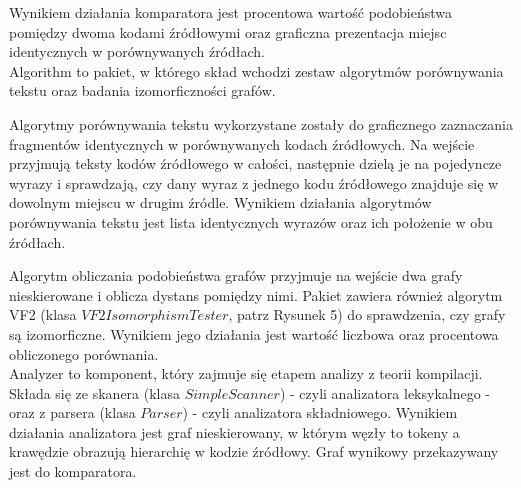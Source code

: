 \documentclass[a4paper,12pt,twoside]{article}
\begin{document}
Wynikiem działania komparatora jest procentowa wartość podobieństwa pomiędzy dwoma kodami źródłowymi oraz graficzna prezentacja miejsc identycznych w porównywanych źródłach.
\\

Algorithm to pakiet, w którego skład wchodzi zestaw algorytmów porównywania tekstu oraz badania izomorficzności grafów. 

Algorytmy porównywania tekstu wykorzystane zostały do graficznego zaznaczania fragmentów identycznych w porównywanych kodach źródłowych. Na wejście przyjmują teksty kodów źródłowego w całości, następnie dzielą je na pojedyncze wyrazy i sprawdzają, czy dany wyraz z jednego kodu źródłowego znajduje się w dowolnym miejscu w drugim źródle. Wynikiem działania algorytmów porównywania tekstu jest lista identycznych wyrazów oraz ich położenie w obu źródłach.

Algorytm obliczania podobieństwa grafów przyjmuje na wejście dwa grafy nieskierowane i oblicza dystans pomiędzy nimi. Pakiet zawiera również algorytm VF2 (klasa $VF2IsomorphismTester$, patrz Rysunek 5) do sprawdzenia, czy grafy są izomorficzne. Wynikiem jego działania jest wartość liczbowa oraz procentowa obliczonego porównania.
\\ 

Analyzer to komponent, który zajmuje się etapem analizy z teorii kompilacji. Składa się ze skanera (klasa $SimpleScanner$) - czyli analizatora leksykalnego - oraz z parsera (klasa $Parser$) - czyli analizatora składniowego. Wynikiem działania analizatora jest graf nieskierowany, w którym węzły to tokeny a krawędzie obrazują hierarchię w kodzie źródłowy. Graf wynikowy przekazywany jest do komparatora.
\end{document}
